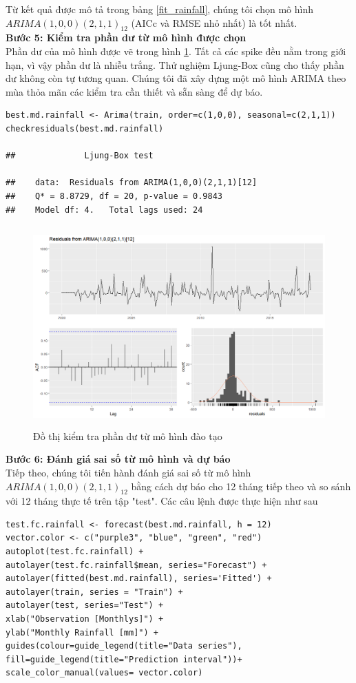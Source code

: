 \documentclass[12pt, a4paper,oneside]{book}
\theoremstyle{definition}
\begin{document}
Từ kết quả được mô tả trong bảng \ref{fit_rainfall}, chúng tôi chọn mô hình $ARIMA(1,0,0)(2,1,1)_{12}$ (AICc và RMSE nhỏ nhất) là tốt nhất.\\
\textbf{Bước 5: Kiểm tra phần dư từ mô hình được chọn}\\
Phần dư của mô hình được vẽ trong hình \ref{V7}. Tất cả các spike đều nằm trong giới hạn, vì vậy phần dư là nhiễu trắng. Thử nghiệm Ljung-Box cũng cho thấy phần dư không còn tự tương quan. Chúng tôi đã xây dựng một mô hình ARIMA theo mùa thỏa mãn các kiểm tra cần thiết và sẵn sàng để dự báo.\\
\begin{lstlisting}
best.md.rainfall <- Arima(train, order=c(1,0,0), seasonal=c(2,1,1))
checkresiduals(best.md.rainfall)

##          	Ljung-Box test

##    data:  Residuals from ARIMA(1,0,0)(2,1,1)[12]
##    Q* = 8.8729, df = 20, p-value = 0.9843
##    Model df: 4.   Total lags used: 24
\end{lstlisting}
\begin{figure}[!htb]
	\centering
	\includegraphics[width=1\linewidth,height=7.7cm]{anh/V7}
	\vskip-4mm 
	\caption{Đồ thị kiểm tra phần dư từ mô hình đào tạo}  
	\label{V7}
\end{figure}
\textbf{Bước 6: Đánh giá sai số từ mô hình và dự báo}\\
Tiếp theo, chúng tôi tiến hành đánh giá sai số từ mô hình $ARIMA(1,0,0)(2,1,1)_{12}$ bằng cách dự báo cho 12 tháng tiếp theo và so sánh với 12 tháng thực tế trên tập "test". Các câu lệnh được thực hiện như sau
\begin{lstlisting}
test.fc.rainfall <- forecast(best.md.rainfall, h = 12) 
vector.color <- c("purple3", "blue", "green", "red")
autoplot(test.fc.rainfall) +
autolayer(test.fc.rainfall$mean, series="Forecast") +
autolayer(fitted(best.md.rainfall), series='Fitted') + 
autolayer(train, series = "Train") +
autolayer(test, series="Test") + 
xlab("Observation [Monthlys]") +
ylab("Monthly Rainfall [mm]") +
guides(colour=guide_legend(title="Data series"), 
fill=guide_legend(title="Prediction interval"))+
scale_color_manual(values= vector.color)
\end{lstlisting}
\end{document}
